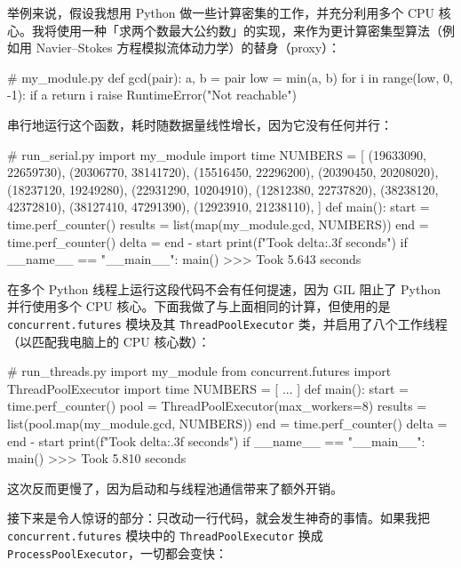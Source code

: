 举例来说，假设我想用 Python 做一些计算密集的工作，并充分利用多个 CPU 核心。我将使用一种「求两个数最大公约数」的实现，来作为更计算密集型算法（例如用 Navier–Stokes 方程模拟流体动力学）的替身（proxy）：

\begin{codebox}[python]
# my_module.py
def gcd(pair):
    a, b = pair
    low = min(a, b)
    for i in range(low, 0, -1):
        if a %
            return i
    raise RuntimeError("Not reachable")
\end{codebox}

串行地运行这个函数，耗时随数据量线性增长，因为它没有任何并行：

\begin{codebox}[python]
# run_serial.py
import my_module
import time
NUMBERS = [
    (19633090, 22659730),
    (20306770, 38141720),
    (15516450, 22296200),
    (20390450, 20208020),
    (18237120, 19249280),
    (22931290, 10204910),
    (12812380, 22737820),
    (38238120, 42372810),
    (38127410, 47291390),
    (12923910, 21238110),
]
def main():
    start = time.perf_counter()
    results = list(map(my_module.gcd, NUMBERS))
    end = time.perf_counter()
    delta = end - start
    print(f"Took {delta:.3f} seconds")
if __name__ == "__main__":
    main()
>>>
Took 5.643 seconds
\end{codebox}

在多个 Python 线程上运行这段代码不会有任何提速，因为 GIL 阻止了 Python 并行使用多个 CPU 核心。下面我做了与上面相同的计算，但使用的是 \texttt{concurrent.futures} 模块及其 \texttt{ThreadPoolExecutor} 类，并启用了八个工作线程（以匹配我电脑上的 CPU 核心数）：

\begin{codebox}[python]
# run_threads.py
import my_module
from concurrent.futures import ThreadPoolExecutor
import time
NUMBERS = [
    ...
]
def main():
    start = time.perf_counter()
    pool = ThreadPoolExecutor(max_workers=8)
    results = list(pool.map(my_module.gcd, NUMBERS))
    end = time.perf_counter()
    delta = end - start
    print(f"Took {delta:.3f} seconds")
if __name__ == "__main__":
    main()
>>>
Took 5.810 seconds
\end{codebox}

这次反而更慢了，因为启动和与线程池通信带来了额外开销。

接下来是令人惊讶的部分：只改动一行代码，就会发生神奇的事情。如果我把 \texttt{concurrent.futures} 模块中的 \texttt{ThreadPoolExecutor} 换成 \texttt{ProcessPoolExecutor}，一切都会变快：

